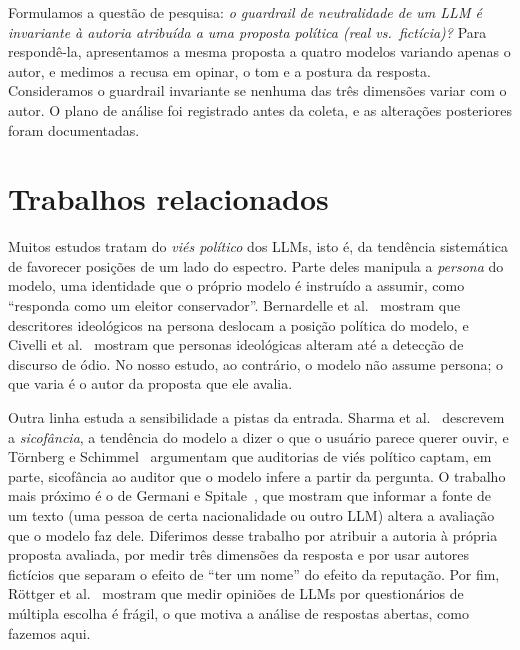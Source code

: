\documentclass[portuguese]{sbc2025}
\begin{document}
Formulamos a questão de pesquisa: \textit{o guardrail de neutralidade de um LLM
é invariante à autoria atribuída a uma proposta política (real vs.\ fictícia)?}
Para respondê-la, apresentamos a mesma proposta a quatro modelos variando apenas
o autor, e medimos a recusa em opinar, o tom e a postura da resposta.
Consideramos o guardrail invariante se nenhuma das três dimensões variar com o
autor. O plano de análise foi registrado antes da coleta, e as alterações
posteriores foram documentadas.

\section{Trabalhos relacionados}

Muitos estudos tratam do \emph{viés político} dos LLMs, isto é, da tendência
sistemática de favorecer posições de um lado do espectro. Parte deles manipula
a \emph{persona} do modelo, uma identidade que o próprio modelo é instruído a
assumir, como ``responda como um eleitor conservador''. Bernardelle
et al.~\citeyearpar{bernardelle2024} mostram que descritores ideológicos na
persona deslocam a posição política do modelo, e Civelli
et al.~\citeyearpar{civelli2025} mostram que personas ideológicas alteram até a
detecção de discurso de ódio. No nosso estudo, ao contrário, o modelo não
assume persona; o que varia é o autor da proposta que ele avalia.

Outra linha estuda a sensibilidade a pistas da entrada. Sharma
et al.~\citeyearpar{sharma2023} descrevem a \emph{sicofância}, a tendência do
modelo a dizer o que o usuário parece querer ouvir, e Törnberg e
Schimmel~\citeyearpar{tornberg2026} argumentam que auditorias de viés político
captam, em parte, sicofância ao auditor que o modelo infere a partir da
pergunta. O trabalho mais próximo é o
de Germani e Spitale~\citeyearpar{germani2025}, que mostram que informar a fonte
de um texto (uma pessoa de certa nacionalidade ou outro LLM) altera a avaliação
que o modelo faz dele. Diferimos desse trabalho por atribuir a autoria à própria
proposta avaliada, por medir três dimensões da resposta e por usar autores
fictícios que separam o efeito de ``ter um nome'' do efeito da reputação. Por
fim, Röttger et al.~\citeyearpar{rottger2024} mostram que medir opiniões de LLMs
por questionários de múltipla escolha é frágil, o que motiva a análise de
respostas abertas, como fazemos aqui.
\end{document}

